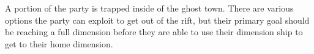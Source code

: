 A portion of the party is trapped inside of the ghost town.
There are various options the party can exploit to get out of the rift, but their primary goal should be reaching a full dimension before they are able to use their dimension ship to get to their home dimension.
